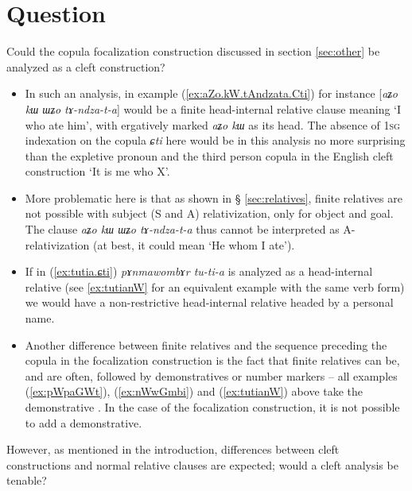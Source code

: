 \documentclass[oneside,a4paper,11pt]{article}
\newcommand{\ipa}[1]{{\phon{#1}}}
\newcommand{\zh}[1]{{\cn #1}}
\newcommand{\fl}{$\rightarrow$}
\begin{document}
\section{Question}
Could the copula focalization construction discussed in section \ref{sec:other} be analyzed as a cleft construction? 
\begin{itemize}
\item In such an analysis, in example (\ref{ex:aZo.kW.tAndzata.Cti}) for instance  [\textit{aʑo kɯ ɯʑo tɤ-ndza-t-a}] would be a finite head-internal relative clause meaning `I who ate him', with ergatively marked \textit{aʑo kɯ} as its head. The absence of \textsc{1sg} indexation on the copula \textit{ɕti} here would be in this analysis no more surprising than the expletive pronoun and the third person copula in the English cleft construction `It is me who X'. 
\item More problematic here is that as shown in § \ref{sec:relatives}, finite relatives are not possible with subject (S and A) relativization, only for object and goal. The clause \textit{aʑo kɯ ɯʑo tɤ-ndza-t-a} thus cannot be interpreted as A-relativization (at best, it could mean `He whom I ate'). 
\item If in (\ref{ex:tutia.ɕti}) \textit{pɤnmawombɤr tu-ti-a} is analyzed as a head-internal relative (see \ref{ex:tutianW} for an equivalent example with the same verb form) we would have a non-restrictive head-internal relative headed by a personal name.
\item Another difference between finite relatives and the sequence preceding the copula in the focalization construction is the fact that finite relatives can be, and are often, followed by demonstratives or number markers -- all examples (\ref{ex:pWpaGWt}),  (\ref{ex:nWwGmbi}) and (\ref{ex:tutianW}) above take the demonstrative \ipa{nɯ}. In the case of the focalization construction, it is not possible to add a demonstrative.
\end{itemize}
However, as mentioned in the introduction, differences between cleft constructions and normal relative clauses are expected; would a cleft analysis be tenable?

 
%



 
\end{document}
